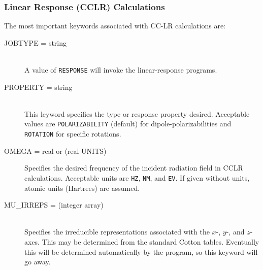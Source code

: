 \subsubsection{Linear Response (CCLR) Calculations}
The most important keywords associated with CC-LR calculations are:
\begin{description}
\item[JOBTYPE = string]\mbox{}\\
A value of {\tt RESPONSE} will invoke the linear-response programs.
\item[PROPERTY = string]\mbox{}\\
This leyword specifies the type or response
property desired.  Acceptable values are {\tt POLARIZABILITY} (default) for
dipole-polarizabilities and {\tt ROTATION} for specific rotations.
\item[OMEGA = real or (real UNITS)]\mbox{}
Specifies the desired frequency of the incident radiation field in CCLR
calculations.  Acceptable units are {\tt HZ}, {\tt NM}, and {\tt EV}.  If
given without units, atomic units (Hartrees) are assumed.
\item[MU\_IRREPS = (integer array)]\mbox{}\\
Specifies the irreducible representations associated with the $x$-, $y$-,
and $z$-axes.  This may be determined from the standard Cotton tables. 
Eventually this will be determined automatically by the program, so this
keyword will go away.
\end{description}
